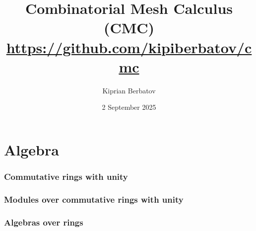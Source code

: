 \documentclass{article}
\title{Combinatorial Mesh Calculus (CMC) \\
       \url{https://github.com/kipiberbatov/cmc}}
\author{Kiprian Berbatov}
\date{2 September 2025}
\theoremstyle{definition}
\begin{document}

\maketitle

\tableofcontents
\NewCommandCopy\oricontentsline\contentsline
\makeatletter
\RenewDocumentCommand{}
{%
  {\let\numberline\@gobble
    }%
}
\makeatother

\listoffigures

\listoftables


\part{Algebra}

\section{Commutative rings with unity}
\label{section:commutative_rings_with_unity}









\section{Modules over commutative rings with unity}
\label{section:modules_over_commutative_rings_with_unity}












\section{Algebras over rings}
\label{section:algebras_over_rings}




\end{document}

